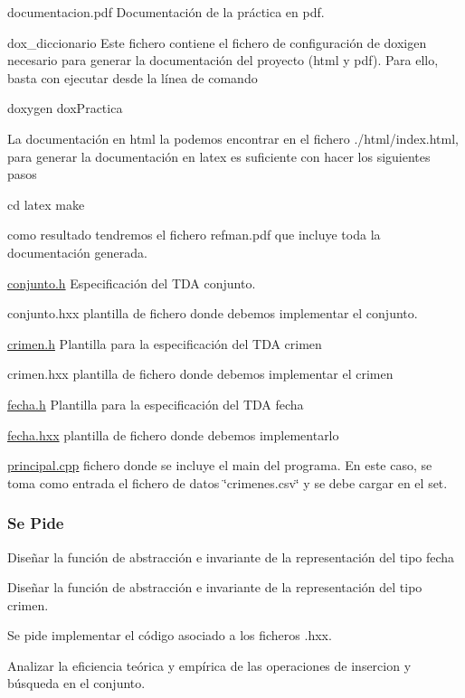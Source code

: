 \begin{DoxyItemize}
\item documentacion.\-pdf Documentación de la práctica en pdf. \item dox\-\_\-diccionario Este fichero contiene el fichero de configuración de doxigen necesario para generar la documentación del proyecto (html y pdf). Para ello, basta con ejecutar desde la línea de comando 
\begin{DoxyCode}
doxygen doxPractica
\end{DoxyCode}
 La documentación en html la podemos encontrar en el fichero ./html/index.html, para generar la documentación en latex es suficiente con hacer los siguientes pasos 
\begin{DoxyCode}
cd latex
make
\end{DoxyCode}
 como resultado tendremos el fichero refman.\-pdf que incluye toda la documentación generada.\end{DoxyItemize}
\begin{DoxyItemize}
\item \hyperlink{conjunto_8h}{conjunto.\-h} Especificación del T\-D\-A conjunto. \item conjunto.\-hxx plantilla de fichero donde debemos implementar el conjunto. \item \hyperlink{crimen_8h}{crimen.\-h} Plantilla para la especificación del T\-D\-A crimen \item crimen.\-hxx plantilla de fichero donde debemos implementar el crimen \item \hyperlink{fecha_8h}{fecha.\-h} Plantilla para la especificación del T\-D\-A fecha \item \hyperlink{fecha_8hxx}{fecha.\-hxx} plantilla de fichero donde debemos implementarlo\end{DoxyItemize}
\begin{DoxyItemize}
\item \hyperlink{principal_8cpp}{principal.\-cpp} fichero donde se incluye el main del programa. En este caso, se toma como entrada el fichero de datos \char`\"{}crimenes.\-csv\char`\"{} y se debe cargar en el set.\end{DoxyItemize}
\hypertarget{index_ssPide}{}\subsubsection{Se Pide}\label{index_ssPide}
\begin{DoxyItemize}
\item Diseñar la función de abstracción e invariante de la representación del tipo fecha \item Diseñar la función de abstracción e invariante de la representación del tipo crimen. \item Se pide implementar el código asociado a los ficheros .hxx. \item Analizar la eficiencia teórica y empírica de las operaciones de insercion y búsqueda en el conjunto.\end{DoxyItemize}
